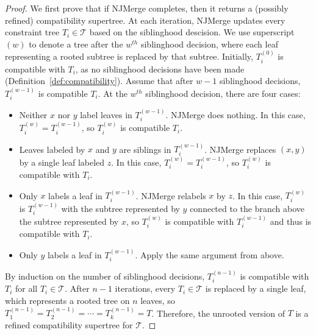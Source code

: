 \begin{proof}
We first prove that if NJMerge completes, then it returns a (possibly refined) compatibility supertree.
At each iteration, NJMerge updates every constraint tree $T_i \in \mathcal{T}$ based on the siblinghood descision.
We use superscript $(w)$ to denote a tree after the $w^{th}$ siblinghood decision, where each leaf representing a rooted subtree is replaced by that subtree.
Initially, $T_i^{(0)}$ is compatible with $T_i$, as no siblinghood decisions have been made (Definition~\ref{def:compatibility}).
Assume that after $w-1$ siblinghood decisions, $T_i^{(w-1)}$ is compatible $T_i$.
At the $w^{th}$ siblinghood decision, there are four cases:
\begin{itemize}
	\item Neither $x$ nor $y$ label leaves in $T_{i}^{(w-1)}$.
		NJMerge does nothing. 
	In this case, $T_{i}^{(w)} = T_{i}^{(w-1)}$, so $T_i^{(w)}$ is compatible $T_i$.
	\item Leaves labeled by $x$ and $y$ are siblings in $T_{i}^{(w-1)}$.
		NJMerge replaces $(x,y)$ by a single leaf labeled $z$. 
	In this case, $T_{i}^{(w)} = T_{i}^{(w-1)}$, so $T_i^{(w)}$ is compatible with $T_i$.
	\item Only $x$ labels a leaf in $T_{i}^{(w-1)}$.
		NJMerge relabels $x$ by $z$.
	In this case, $T_{i}^{(w)}$ is $T_{i}^{(w-1)}$ with the subtree represented by $y$ connected to the branch above the subtree represented by $x$, so $T_i^{(w)}$ is compatible with $T_i^{(w-1)}$ and thus is compatible with $T_i$.
	\item  Only $y$ labels a leaf in $T_{i}^{(w-1)}$. 
	Apply the same argument from above.
\end{itemize}
By induction on the number of siblinghood decisions, $T_i^{(n-1)}$ is compatible with $T_i$ for all $T_i \in \mathcal{T}$.
After $n-1$ iterations, every $T_i \in \mathcal{T}$ is replaced by a single leaf, which represents a rooted tree on $n$ leaves, so $T_1^{(n-1)} = T_2^{(n-1)} = \cdots = T_k^{(n-1)} = T$.
Therefore, the unrooted version of $T$ is a refined compatibility supertree for $\mathcal{T}$.


\end{proof}

